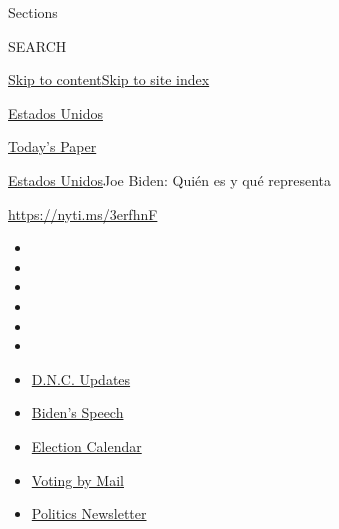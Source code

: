 Sections

SEARCH

\protect\hyperlink{site-content}{Skip to
content}\protect\hyperlink{site-index}{Skip to site index}

\href{https://www.nytimes3xbfgragh.onion/es/section/estados-unidos}{Estados
Unidos}

\href{https://myaccount.nytimes3xbfgragh.onion/auth/login?response_type=cookie\&client_id=vi}{}

\href{https://www.nytimes3xbfgragh.onion/section/todayspaper}{Today's
Paper}

\href{/es/section/estados-unidos}{Estados Unidos}\textbar{}Joe Biden:
Quién es y qué representa

\url{https://nyti.ms/3erfhnF}

\begin{itemize}
\item
\item
\item
\item
\item
\item
\end{itemize}

\begin{itemize}
\item
  \href{https://www.nytimes3xbfgragh.onion/live/2020/08/20/us/dnc-convention-election?action=click\&pgtype=Article\&state=default\&region=TOP_BANNER\&context=storylines_menu}{D.N.C.
  Updates}
\item
  \href{https://www.nytimes3xbfgragh.onion/2020/08/20/us/politics/biden-presidential-nomination-dnc.html?action=click\&pgtype=Article\&state=default\&region=TOP_BANNER\&context=storylines_menu}{Biden's
  Speech}
\item
  \href{https://www.nytimes3xbfgragh.onion/interactive/2019/us/elections/2020-presidential-election-calendar.html?action=click\&pgtype=Article\&state=default\&region=TOP_BANNER\&context=storylines_menu}{Election
  Calendar}
\item
  \href{https://www.nytimes3xbfgragh.onion/interactive/2020/08/11/us/politics/vote-by-mail-us-states.html?action=click\&pgtype=Article\&state=default\&region=TOP_BANNER\&context=storylines_menu}{Voting
  by Mail}
\item
  \href{https://www.nytimes3xbfgragh.onion/newsletters/politics?action=click\&pgtype=Article\&state=default\&region=TOP_BANNER\&context=storylines_menu}{Politics
  Newsletter}
\end{itemize}

